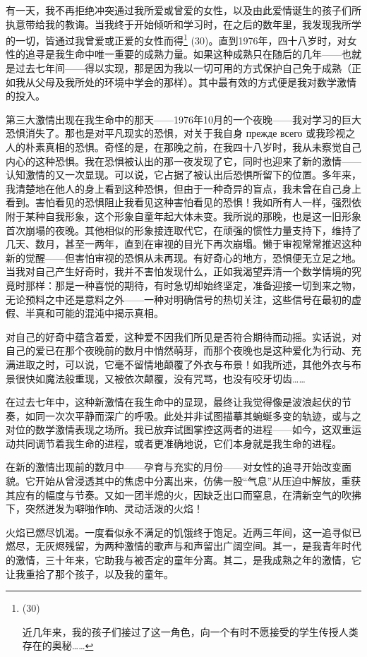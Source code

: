 有一天，我不再拒绝冲突通过我所爱或曾爱的女性，以及由此爱情诞生的孩子们所执意带给我的教诲。当我终于开始倾听和学习时，在之后的数年里，我发现我所学的一切，皆通过我曾爱或正爱的女性而得\footnote{(30)\par 近几年来，我的孩子们接过了这一角色，向一个有时不愿接受的学生传授人类存在的奥秘……} (30)。直到1976年，四十八岁时，对女性的追寻是我生命中唯一重要的成熟力量。如果这种成熟只在随后的几年——也就是过去七年间——得以实现，那是因为我以一切可用的方式保护自己免于成熟（正如我从父母及我所处的环境中学会的那样）。其中最有效的方式便是我对数学激情的投入。

第三大激情出现在我生命中的那天——1976年10月的一个夜晚——我对学习的巨大恐惧消失了。那也是对平凡现实的恐惧，对关于我自身 прежде всего 或我珍视之人的朴素真相的恐惧。奇怪的是，在那晚之前，在我四十八岁时，我从未察觉自己内心的这种恐惧。我在恐惧被认出的那一夜发现了它，同时也迎来了新的激情——认知激情的又一次显现。可以说，它占据了被认出后恐惧所留下的位置。多年来，我清楚地在他人的身上看到这种恐惧，但由于一种奇异的盲点，我未曾在自己身上看到。害怕看见的恐惧阻止我看见这种害怕看见的恐惧！我如所有人一样，强烈依附于某种自我形象，这个形象自童年起大体未变。我所说的那晚，也是这一旧形象首次崩塌的夜晚。其他相似的形象接连取代它，在顽强的惯性力量支持下，维持了几天、数月，甚至一两年，直到在审视的目光下再次崩塌。懒于审视常常推迟这种新的觉醒——但害怕审视的恐惧从未再现。有好奇心的地方，恐惧便无立足之地。当我对自己产生好奇时，我并不害怕发现什么，正如我渴望弄清一个数学情境的究竟时那样：那是一种喜悦的期待，有时急切却始终坚定，准备迎接一切到来之物，无论预料之中还是意料之外——一种对明确信号的热切关注，这些信号在最初的虚假、半真和可能的混沌中揭示真相。

对自己的好奇中蕴含着爱，这种爱不因我们所见是否符合期待而动摇。实话说，对自己的爱已在那个夜晚前的数月中悄然萌芽，而那个夜晚也是这种爱化为行动、充满进取之时，可以说，它毫不留情地颠覆了外衣与布景！如我所述，其他外衣与布景很快如魔法般重现，又被依次颠覆，没有咒骂，也没有咬牙切齿……

在过去七年中，这种新激情在我生命中的显现，最终让我觉得像是波浪起伏的节奏，如同一次次平静而深广的呼吸。此处并非试图描摹其蜿蜒多变的轨迹，或与之对位的数学激情表现之场所。我已放弃试图掌控这两者的进程——如今，这双重运动共同调节着我生命的进程，或者更准确地说，它们本身就是我生命的进程。

在新的激情出现前的数月中——孕育与充实的月份——对女性的追寻开始改变面貌。它开始从曾浸透其中的焦虑中分离出来，仿佛一股“气息”从压迫中解放，重获其应有的幅度与节奏。又如一团半熄的火，因缺乏出口而窒息，在清新空气的吹拂下，突然迸发为噼啪作响、灵动活泼的火焰！

火焰已燃尽饥渴。一度看似永不满足的饥饿终于饱足。近两三年间，这一追寻似已燃尽，无灰烬残留，为两种激情的歌声与和声留出广阔空间。其一，是我青年时代的激情，三十年来，它助我与被否定的童年分离。其二，是我成熟之年的激情，它让我重拾了那个孩子，以及我的童年。
